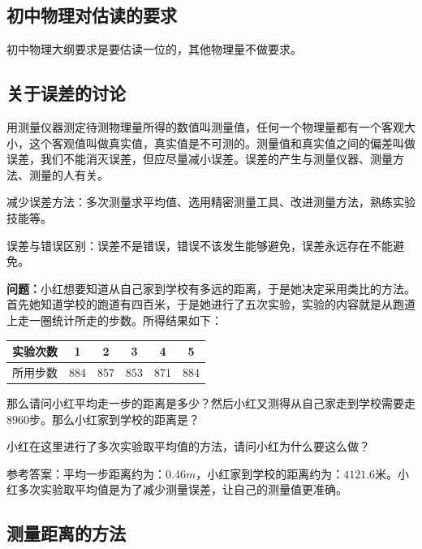 \documentclass[12pt,twoside]{exam}
\begin{document}
\begin{knowledge}
\begin{minipage}{\textwidth}
\end{minipage} 

\vspace{45pt}


\subsection{初中物理对估读的要求}
初中物理大纲要求是要估读一位的，其他物理量不做要求。


\subsection{关于误差的讨论}
用测量仪器测定待测物理量所得的数值叫测量值，任何一个物理量都有一个客观大小，这个客观值叫做真实值，真实值是不可测的。测量值和真实值之间的偏差叫做误差，我们不能消灭误差，但应尽量减小误差。误差的产生与测量仪器、测量方法、测量的人有关。

减少误差方法：多次测量求平均值、选用精密测量工具、改进测量方法，熟练实验技能等。

误差与错误区别：误差不是错误，错误不该发生能够避免，误差永远存在不能避免。


\textbf{问题：}小红想要知道从自己家到学校有多远的距离，于是她决定采用类比的方法。首先她知道学校的跑道有四百米，于是她进行了五次实验，实验的内容就是从跑道上走一圈统计所走的步数。所得结果如下：
\begin{table}[H]
\centering
\begin{tabular}{|p{8ex}|c|c|c|c|c|}
\hline 
实验次数 & 1 & 2 & 3 & 4 & 5 \\ 
\hline 
所用步数 & 884 & 857 & 853 & 871 & 884 \\ 
\hline 
\end{tabular} 
\end{table}
那么请问小红平均走一步的距离是多少？然后小红又测得从自己家走到学校需要走$8960$步。那么小红家到学校的距离是？

小红在这里进行了多次实验取平均值的方法，请问小红为什么要这么做？


\begin{solution}[10ex]
参考答案：平均一步距离约为：$0.46m$，小红家到学校的距离约为：$4121.6$米。小红多次实验取平均值是为了减少测量误差，让自己的测量值更准确。
\end{solution}



\subsection{测量距离的方法}

\end{knowledge}
\end{document}
